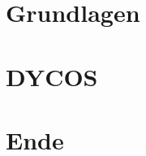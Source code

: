 \documentclass[hyperref={pdfpagelabels=false},usepdftitle=false]{beamer}
\begin{document}
\title{\titleText}
\subtitle{}
\author{\tutor}
\date{28. Februar 2014}
\subject{Proseminar Informatik}

\frame{\titlepage}


\section{Grundlagen}


\section{DYCOS}


\section{Ende}

\end{document}
